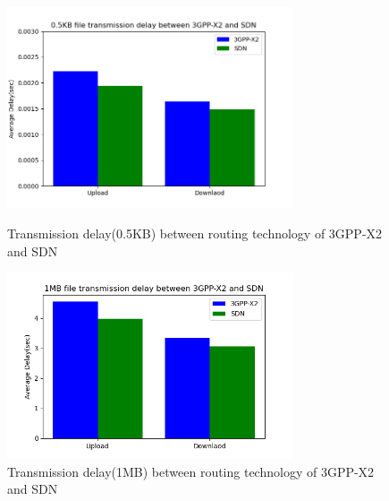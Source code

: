 \documentclass[journal,10pt]{IEEEtran}
\begin{document}
\begin{figure}
    \centering
    \includegraphics[width=240pt]{picture/0.5KB.png}
    \caption{Transmission delay(0.5KB) between routing technology of 3GPP-X2 and SDN}
    \label{fig:x2}
    
    \centering
    \includegraphics[width=240pt]{picture/1MB.png}
    \caption{Transmission delay(1MB) between routing technology of 3GPP-X2 and SDN}
    \label{fig:sdn}
\end{figure}
\end{document}
